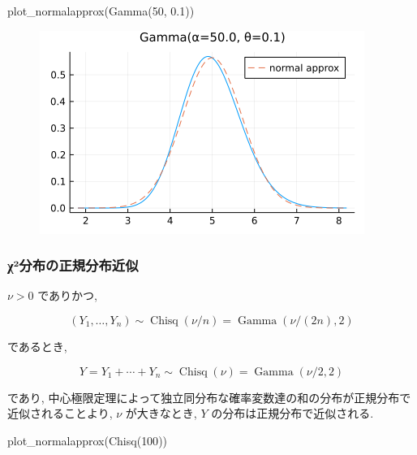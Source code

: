 \documentclass[
  letterpaper,
  DIV=11,
  numbers=noendperiod]{scrartcl}
\newenvironment{Shaded}{\begin{snugshade}}{\end{snugshade}}
\newcommand{\FloatTok}[1]{\textcolor[rgb]{0.68,0.00,0.00}{#1}}
\newcommand{\FunctionTok}[1]{\textcolor[rgb]{0.28,0.35,0.67}{#1}}
\newcommand{\NormalTok}[1]{\textcolor[rgb]{0.00,0.23,0.31}{#1}}
\begin{document}
\begin{Shaded}
\begin{Highlighting}[]
\FunctionTok{plot\_normalapprox}\NormalTok{(}\FunctionTok{Gamma}\NormalTok{(}\FloatTok{50}\NormalTok{, }\FloatTok{0.1}\NormalTok{))}
\end{Highlighting}
\end{Shaded}

\begin{figure}[H]

{\centering \includegraphics{05 Central limit theorem_files/figure-pdf/cell-122-output-1.png}

}

\end{figure}

\hypertarget{ux3c7uxb2ux5206ux5e03ux306eux6b63ux898fux5206ux5e03ux8fd1ux4f3c}{%
\subsubsection{χ²分布の正規分布近似}\label{ux3c7uxb2ux5206ux5e03ux306eux6b63ux898fux5206ux5e03ux8fd1ux4f3c}}

\(\nu > 0\) でありかつ,

\[
(Y_1,\ldots,Y_n) \sim \operatorname{Chisq}(\nu/n) = \operatorname{Gamma}(\nu/(2n), 2)
\]

であるとき,

\[
Y = Y_1 + \cdots + Y_n \sim \operatorname{Chisq}(\nu) = \operatorname{Gamma}(\nu/2, 2)
\]

であり,
中心極限定理によって独立同分布な確率変数達の和の分布が正規分布で近似されることより,
\(\nu\) が大きなとき, \(Y\) の分布は正規分布で近似される.

\begin{Shaded}
\begin{Highlighting}[]
\FunctionTok{plot\_normalapprox}\NormalTok{(}\FunctionTok{Chisq}\NormalTok{(}\FloatTok{100}\NormalTok{))}
\end{Highlighting}
\end{Shaded}
\end{document}
